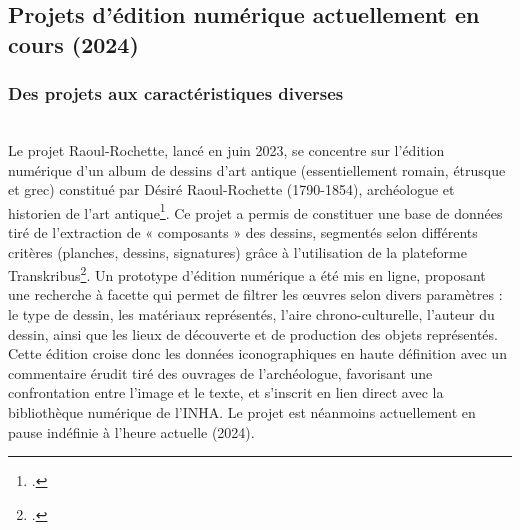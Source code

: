 \subsection{Projets d’édition numérique actuellement en cours (2024)}

\subsubsection{Des projets aux caractéristiques diverses}

\\

Le projet Raoul-Rochette, lancé en juin 2023, se concentre sur l’édition numérique d’un album de dessins d'art antique (essentiellement romain, étrusque et grec) constitué par Désiré Raoul-Rochette (1790-1854), archéologue et historien de l’art antique\footcite{gran-aymerich_raoul-rochette_2010}.
Ce projet a permis de constituer une base de données tiré de l’extraction de « composants » des dessins, segmentés selon différents critères (planches, dessins, signatures) grâce à l’utilisation de la plateforme Transkribus\footcite{inha_dessins_nodate}. Un prototype d’édition numérique a été mis en ligne, proposant une recherche à facette qui permet de filtrer les œuvres selon divers paramètres : le type de dessin, les matériaux représentés, l’aire chrono-culturelle, l’auteur du dessin, ainsi que les lieux de découverte et de production des objets représentés. Cette édition croise donc les données iconographiques en haute définition avec un commentaire érudit tiré des ouvrages de l’archéologue, favorisant une confrontation entre l'image et le texte, et s’inscrit en lien direct avec la bibliothèque numérique de l’INHA. 
Le projet est néanmoins actuellement en pause indéfinie à l'heure actuelle (2024).
\newline
{}\\

